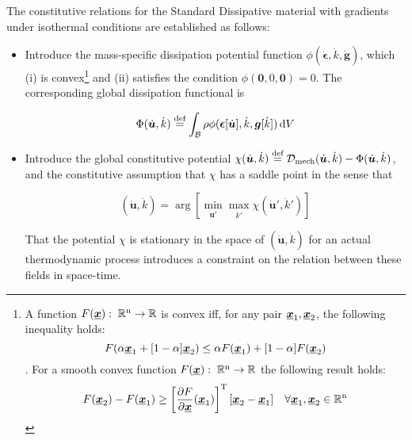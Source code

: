 The constitutive relations for the Standard Dissipative material with gradients under isothermal conditions are established as follows:
\begin{itemize}
    \item Introduce the mass-specific dissipation potential function $\phi(\dot{\bm{\epsilon}},\dot{k},\dot{\bm{g}})$, which (i) is convex\footnote{A function $F(\underline{\mbox{\boldmath $x$}}):\;{\mathbb{R}}^{\mathrm{n}}\rightarrow{\mathbb{R}}$ is convex iff, for any pair $\underline{\mbox{\boldmath $x$}}_1, \underline{\mbox{\boldmath $x$}}_2$, the following inequality holds: $$F(\alpha\underline{\mbox{\boldmath $x$}}_1+[1-\alpha]\underline{\mbox{\boldmath $x$}}_2)\leq\alpha F(\underline{\mbox{\boldmath $x$}}_1)+[1-\alpha]F(\underline{\mbox{\boldmath $x$}}_2)$$. For a smooth convex function $F(\underline{\mbox{\boldmath $x$}}):\;{\mathbb{R}}^{\mathrm{n}}\rightarrow{\mathbb{R}}$ the following result holds: $$ F(\underline{\mbox{\boldmath $x$}}_2)- F(\underline{\mbox{\boldmath $x$}}_1)\geq\left[\frac{\partial F}{\partial \underline{\mbox{\boldmath $x$}}}(\underline{\mbox{\boldmath $x$}}_1)\right]^{\mathrm{T}}
        [\underline{\mbox{\boldmath $x$}}_2-\underline{\mbox{\boldmath $x$}}_1]\quad\forall\underline{\mbox{\boldmath $x$}}_1, \underline{\mbox{\boldmath $x$}}_2\in{\mathbb{R}}^{\mathrm{n}}$$} and (ii) satisfies the condition $\phi(\bm{0},0,\bm{0})=0$. The corresponding global dissipation functional is

 $$ \Phi(\dot{\bm{u}},\dot{k}) \stackrel{\text{def}}{=} \int_{\mathcal{B}} \rho\phi(\bm{\epsilon}[\dot{\bm{u}}],\dot{k},\bm{g}[\dot{k}]) \mathop{}\!\mathrm{d} V $$

    \item Introduce the global constitutive potential $\chi(\dot{\bm{u}},\dot{k})\stackrel{\text{def}}{=} {\mathcal D}_{\mathrm{mech}}(\dot{\bm{u}},\dot{k})-\Phi(\dot{\bm{u}},\dot{k})$, and the constitutive assumption that $\chi$ has a saddle point in the sense that

 $$ (\dot{\bm{u}},\dot{k}) = \arg\left[\min_{\dot{\bm{u}}'}\max_{\dot{k}'} \chi(\dot{\bm{u}}',\dot{k}') \right]$$

        That the potential $\chi$ is stationary in the space of $(\dot{\bm{u}},\dot{k})$ for an actual thermodynamic process introduces a constraint on the relation between these fields in space-time.
\end{itemize}

